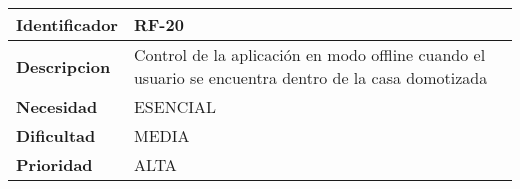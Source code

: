 \begin{center}
    \begin{tabular}{|p{2.6cm}|p{12cm}|}
    \hline
    \textbf{Identificador} & RF-20\\
    \hline
    \textbf{Descripcion} & Control de la aplicación en modo offline cuando el usuario se encuentra dentro de la casa domotizada\\
    \hline
    \textbf{Necesidad} & ESENCIAL\\
    \hline
    \textbf{Dificultad} & MEDIA\\
    \hline
    \textbf{Prioridad} & ALTA\\
    \hline
    \end{tabular}
\end{center}
